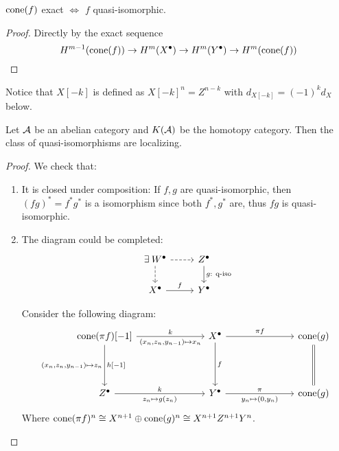 \begin{coro} \label{coro:cone-exact-iff-quasi-isomorphic}
  $\operatorname{cone}(f)$ exact $\iff$ $f$ quasi-isomorphic.

  \begin{proof}
    Directly by the exact sequence
    \[ H^{m-1}(\operatorname{cone}(f)) \to H^m(X^\bullet) \to H^m(Y^\bullet) \to H^{m}(\operatorname{cone}(f)) \]
  \end{proof}
\end{coro}

Notice that $X[-k]$ is defined as $X[-k]^n = Z^{n-k}$ with $d_{X[-k]} = (-1)^k d_X$ below.

\begin{theorem}
  Let $\mathcal{A}$ be an abelian category and $K(\mathcal{A})$ be the homotopy category.
  Then the class of quasi-isomorphisms are localizing.

  \begin{proof}
    We check that:
    \begin{enumerate}
      \item It is closed under composition:
        If $f, g$ are quasi-isomorphic, then $(fg)^* = f^* g^*$ is
        a isomorphism since both $f^*, g^*$ are, thus $fg$ is quasi-isomorphic.
      \item The diagram could be completed:
        \[ \begin{tikzcd}
            \exists W^\bullet \ar[r, dashed] \ar[d, dashed] &
            Z^\bullet \ar[d, "g:\ \text{q-iso}"] \\
            X^\bullet \ar[r, "f"] & Y^\bullet
          \end{tikzcd} \]

        Consider the following diagram:
        \[ \begin{tikzcd}[column sep=2.5cm, row sep=1.5cm]
            \cone(\pi f)[-1] \ar[r, "k", "{(x_n, z_n, y_{n-1}) \mapsto x_n}"']
            \ar[d, "{h[-1]}", "{(x_n, z_n, y_{n-1}) \mapsto z_n}"']
            &
            X^\bullet \ar[r, "\pi f"] \ar[d, "f"] &
            \cone(g) \ar[d, equal]  \\
            Z^\bullet \ar[r, "k", "{z_n \mapsto g(z_n)}"'] &
            Y^\bullet \ar[r, "\pi", "{y_n \mapsto (0, y_n)}"'] &
            \cone(g)
          \end{tikzcd} \]
        Where $\operatorname{cone}(\pi f)^n \cong X^{n+1} \oplus \operatorname{cone}(g)^{n} \cong X^{n+1} Z^{n+1} Y^{n}$.


\end{enumerate}
\end{proof}
\end{theorem}

